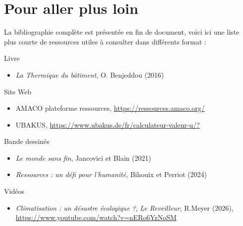 \chapter{Pour aller plus loin}
La bibliographie complète est présentée en fin de document, voici ici une liste plus courte de ressources utiles à consulter dans différents format :

\begin{encadre}{Livre}
  \begin{itemize}
    \item \textit{La Thermique du bâtiment}, O. Benjeddou (2016)
  \end{itemize}
\end{encadre}

\begin{encadre}{Site Web}
  \begin{itemize}
    \item AMACO plateforme ressources, \url{https://ressources.amaco.org/}
    \item UBAKUS, \url{https://www.ubakus.de/fr/calculateur-valeur-u/?}
  \end{itemize}
\end{encadre}

\begin{encadre}{Bande dessinés}
  \begin{itemize}
    \item \textit{Le monde sans fin}, Jancovici et Blain (2021)
    \item \textit{Ressources : un défi pour l'humanité}, Bihouix et Perriot (2024)
  \end{itemize}
\end{encadre}

\begin{encadre}{Vidéos}
  \begin{itemize}
    \item \textit{Climatisation : un désastre écologique ?}, \textit{Le Reveilleur}, R.Meyer (2026), \url{https://www.youtube.com/watch?v=nERo6YzNoSM}
  \end{itemize}
\end{encadre}